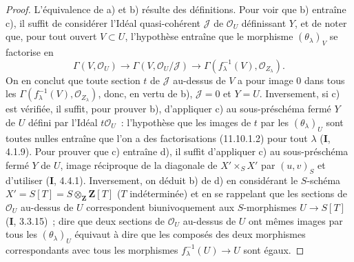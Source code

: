 \begin{proof}
L'équivalence de a) et b) résulte des définitions. Pour voir que b) entraîne
c), il suffit de considérer l'Idéal quasi-cohérent $\mathcal J$ de
$\mathcal O_U$ définissant $Y$, et de noter que, pour tout ouvert $V\subset U$,
l'hypothèse entraîne que le morphisme $(\theta_\lambda)_V$ se factorise en
\[
\Gamma(V,\mathcal O_U)\longrightarrow
\Gamma(V,\mathcal O_U/\mathcal J)\longrightarrow
\Gamma(f_\lambda^{-1}(V),\mathcal O_{Z_\lambda}).
\]
On en conclut que toute section $t$ de $\mathcal J$ au-dessus de $V$ a pour
image 0 dans tous les $\Gamma(f_\lambda^{-1}(V),\mathcal O_{Z_\lambda})$,
donc, en vertu de b), $\mathcal J=0$ et $Y=U$. Inversement, si c) est vérifiée,
il suffit, pour prouver b), d'appliquer c) au sous-préschéma fermé $Y$ de $U$
défini par l'Idéal $t\mathcal O_U$~: l'hypothèse que les images de $t$ par les
$(\theta_\lambda)_U$ sont toutes nulles entraîne que l'on a des factorisations
(11.10.1.2) pour tout $\lambda$ ($\mathbf I$, 4.1.9). Pour prouver que c)
entraîne d), il suffit d'appliquer c) au sous-préschéma fermé $Y$ de $U$, image
réciproque de la diagonale de $X'\times_SX'$ par $(u,v)_S$ et d'utiliser
($\mathbf I$, 4.4.1). Inversement, on déduit b) de d) en considérant le
$S$-schéma $X'=S[T]=S\otimes_{\mathbf Z}\mathbf Z[T]$ ($T$ indéterminée) et en
se rappelant que les sections de $\mathcal O_U$ au-dessus de $U$ correspondent
biunivoquement aux $S$-morphismes $U\to S[T]$ ($\mathbf I$, 3.3.15)~; dire que
deux sections de $\mathcal O_U$ au-dessus de $U$ ont mêmes images par tous les
$(\theta_\lambda)_U$ équivaut à dire que les composés des deux morphismes
correspondants avec tous les morphismes $f_\lambda^{-1}(U)\to U$ sont égaux.
\end{proof}

